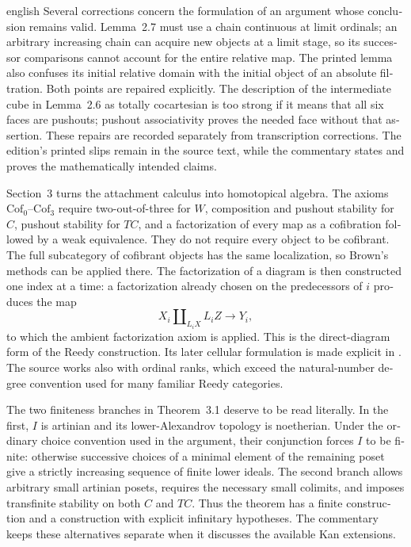 \begin{otherlanguage}{english}
\begin{otherlanguage*}{english}
Several corrections concern the formulation of an argument whose conclusion remains valid. Lemma~2.7 must use a chain continuous at limit ordinals; an arbitrary increasing chain can acquire new objects at a limit stage, so its successor comparisons cannot account for the entire relative map. The printed lemma also confuses its initial relative domain with the initial object of an absolute filtration. Both points are repaired explicitly. The description of the intermediate cube in Lemma~2.6 as totally cocartesian is too strong if it means that all six faces are pushouts; pushout associativity proves the needed face without that assertion. These repairs are recorded separately from transcription corrections. The edition's printed slips remain in the source text, while the commentary states and proves the mathematically intended claims.

Section~3 turns the attachment calculus into homotopical algebra. The axioms $\mathrm{Cof}_0$--$\mathrm{Cof}_3$ require two-out-of-three for $W$, composition and pushout stability for $C$, pushout stability for $TC$, and a factorization of every map as a cofibration followed by a weak equivalence. They do not require every object to be cofibrant. The full subcategory of cofibrant objects has the same localization, so Brown's methods can be applied there. The factorization of a diagram is then constructed one index at a time: a factorization already chosen on the predecessors of $i$ produces the map
\[
 X_i\amalg_{L_iX}L_iZ\longrightarrow Y_i,
\]
to which the ambient factorization axiom is applied. This is the direct-diagram form of the Reedy construction. Its later cellular formulation is made explicit in \citet[Proposition~6.3 and Lemma~7.1]{RiehlVerity2014Reedy}. The source works also with ordinal ranks, which exceed the natural-number degree convention used for many familiar Reedy categories.

The two finiteness branches in Theorem~3.1 deserve to be read literally. In the first, $I$ is artinian and its lower-Alexandrov topology is noetherian. Under the ordinary choice convention used in the argument, their conjunction forces $I$ to be finite: otherwise successive choices of a minimal element of the remaining poset give a strictly increasing sequence of finite lower ideals. The second branch allows arbitrary small artinian posets, requires the necessary small colimits, and imposes transfinite stability on both $C$ and $TC$. Thus the theorem has a finite construction and a construction with explicit infinitary hypotheses. The commentary keeps these alternatives separate when it discusses the available Kan extensions.


\end{otherlanguage*}
\end{otherlanguage}
